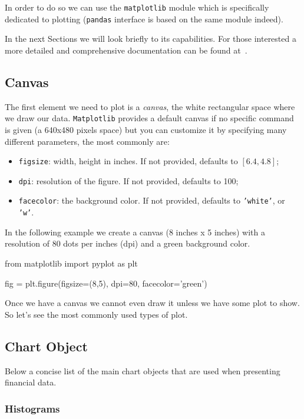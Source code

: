 \begin{ipython}
In order to do so we can use the \texttt{matplotlib} module which is specifically dedicated to plotting (\texttt{pandas} interface is based on the same module indeed). 

In the next Sections we will look briefly to its capabilities. For those interested a more detailed and comprehensive documentation can be found at~\cite{matplotlib}.

\subsection{Canvas}\label{canvas}

The first element we need to plot is a \emph{canvas}, the white rectangular space where we draw our data. \texttt{Matplotlib} provides a default canvas if no specific command is given (a 640x480 pixels space) but you can customize it by specifying many different parameters, the most commonly are:

\begin{itemize}
	\tightlist
	\item
	\texttt{figsize}: width, height in inches. If not provided, defaults
	to \([6.4, 4.8]\);
	\item
	\texttt{dpi}: resolution of the figure. If not provided, defaults to
	100;
	\item
	\texttt{facecolor}: the background color. If not provided, defaults to
	\texttt{'white'}, or \texttt{'w'}.
\end{itemize}

In the following example we create a canvas (8 inches x 5 inches) with a resolution of 80 dots per inches (dpi) and a green background color.

\begin{ipython}
from matplotlib import pyplot as plt

fig = plt.figure(figsize=(8,5), dpi=80, facecolor='green')
\end{ipython}

Once we have a canvas we cannot even draw it unless we have some plot to
show. So let's see the most commonly used types of plot.

\subsection{Chart Object}\label{chart-object}

Below a concise list of the main chart objects that are used when presenting financial data.

\subsubsection{Histograms}\label{histograms}


\end{ipython}
